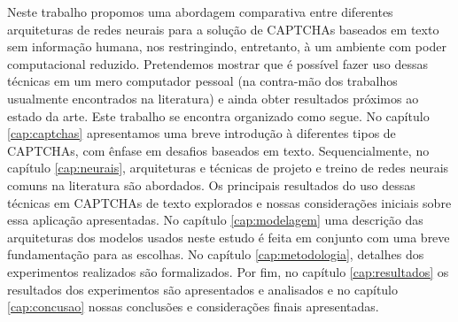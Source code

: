 Neste trabalho propomos uma abordagem comparativa entre diferentes arquiteturas de redes neurais para a solução de CAPTCHAs baseados em texto sem informação humana, nos restringindo, entretanto, à um ambiente com poder computacional reduzido. Pretendemos mostrar que é possível fazer uso dessas técnicas em um mero computador pessoal (na contra-mão dos trabalhos usualmente encontrados na literatura) e ainda obter resultados próximos ao estado da arte. Este trabalho se encontra organizado como segue. No capítulo \ref{cap:captchas} apresentamos uma breve introdução à diferentes tipos de CAPTCHAs, com ênfase em desafios baseados em texto. Sequencialmente, no capítulo \ref{cap:neurais}, arquiteturas e técnicas de projeto e treino de redes neurais comuns na literatura são abordados. Os principais resultados do uso dessas técnicas em CAPTCHAs de texto explorados e nossas considerações iniciais sobre essa aplicação apresentadas. No capítulo \ref{cap:modelagem} uma descrição das arquiteturas dos modelos usados neste estudo é feita em conjunto com uma breve fundamentação para as escolhas. No capítulo \ref{cap:metodologia}, detalhes dos experimentos realizados são formalizados. Por fim, no capítulo \ref{cap:resultados} os resultados dos experimentos são apresentados e analisados e no capítulo \ref{cap:concusao} nossas conclusões e considerações finais apresentadas.

